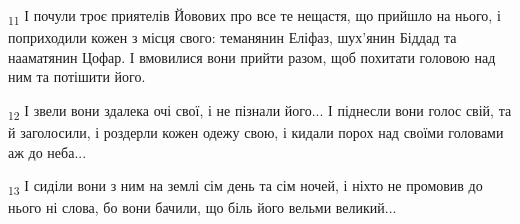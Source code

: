 \begin{tcolorbox}
\textsubscript{11} І почули троє приятелів Йовових про все те нещастя, що прийшло на нього, і поприходили кожен з місця свого: теманянин Еліфаз, шух'янин Біддад та нааматянин Цофар. І вмовилися вони прийти разом, щоб похитати головою над ним та потішити його.
\end{tcolorbox}
\begin{tcolorbox}
\textsubscript{12} І звели вони здалека очі свої, і не пізнали його... І піднесли вони голос свій, та й заголосили, і роздерли кожен одежу свою, і кидали порох над своїми головами аж до неба...
\end{tcolorbox}
\begin{tcolorbox}
\textsubscript{13} І сиділи вони з ним на землі сім день та сім ночей, і ніхто не промовив до нього ні слова, бо вони бачили, що біль його вельми великий...
\end{tcolorbox}
